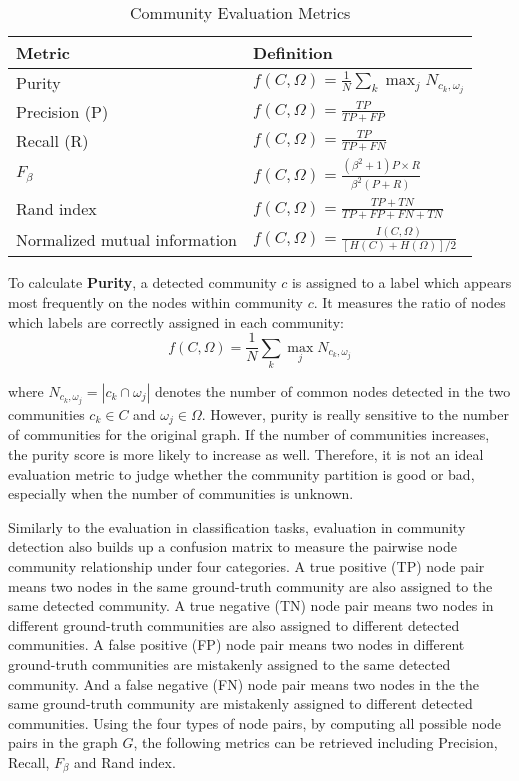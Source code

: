 \begin{table}
	\centering
	\begin{tabular}{|p{5.5cm}|p{8.5cm}|} \hline
		\textbf{Metric} &  \textbf{Definition}    \\ \hline 
		Purity& $f(C,\Omega) = \frac{1}{N} \sum_{k} \max_{j}N_{c_{k},\omega_{j}}$  \\ \hline  
		Precision (P)& $f(C,\Omega) = \frac{TP}{TP+FP}$ \\ \hline
		Recall (R)& $f(C,\Omega) = \frac{TP}{TP+FN}$\\  \hline
		$F_{\beta}$& $f(C,\Omega) = \frac{(\beta^{2}+1)P\times R}{\beta^{2}(P+R)}$ \\ \hline  
		Rand index& $f(C,\Omega) = \frac{TP+TN}{TP+FP+FN+TN}$ \\ \hline 
		Normalized mutual information & $ f(C,\Omega) = \frac{I(C,\Omega)}{[H(C)+H(\Omega)]/2}$ \\ \hline  
	\end{tabular}
	\caption{Community Evaluation Metrics}
	\label{tab:c2_evaluation_metric}
	
\end{table} 


To calculate \textbf{Purity}, a detected community $c$ is assigned to a label which appears most frequently on the nodes within community $c$. It measures the ratio of nodes which labels are correctly assigned in each community:
\begin{equation}
	f(C,\Omega) = \frac{1}{N} \sum_{k} \max_{j}N_{c_{k},\omega_{j}}
\end{equation}

where $N_{c_{k},\omega_{j}} = |c_{k}\cap \omega_{j}|$ denotes the number of common nodes detected in the two communities $c_k \in C $ and $\omega_j \in \Omega$.  However, purity is really sensitive to the number of communities for the original graph. If the number of communities increases, the purity score is more likely to increase as well. Therefore, it is not an ideal evaluation metric to judge whether the community partition is good or bad, especially when the number of communities is unknown.

Similarly to the evaluation in classification tasks, evaluation in community detection also builds up a confusion matrix to measure the pairwise node community relationship under four categories.  A true positive (TP) node pair means two nodes in the same ground-truth community are also assigned to the same detected community. A true negative (TN) node pair means two nodes in different ground-truth communities are also assigned to different detected communities. A false positive (FP) node pair means two nodes in different ground-truth communities are mistakenly assigned to the same detected community. And a false negative (FN) node pair means two nodes in the the same ground-truth community are mistakenly assigned to different detected communities. Using the four types of node pairs, by computing all possible node pairs in the graph  $G$, the following metrics can be retrieved including Precision, Recall, $F_\beta$ and Rand index.

